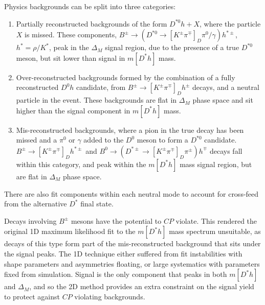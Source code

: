 \documentclass[oneside,12pt]{article}
\begin{document}
Physics backgrounds can be split into three categories:
\begin{enumerate}
	\item Partially reconstructed backgrounds of the form $D^{*0}h+X$, where the
particle $X$ is missed. These components, $B^{\pm}\rightarrow
(D^{*0}\rightarrow [K^{\pm}\pi^{\mp}]_D \pi^0/\gamma)h^{*\pm}$, $h^*=\rho/K^*$,
peak in the $\Delta_M$ signal region, due to the presence of a true $D^{*0}$
meson, but sit lower than signal in $m[D^*h]$ mass.
  \item Over-reconstructed backgrounds formed by the combination of a fully
	reconstructed $D^0h$ candidate, from $B^{\pm}\rightarrow
[K^{\pm}\pi^{\mp}]_Dh^{\pm}$ decays, and a neutral particle in the event.
These backgrounds are flat in $\Delta_M$ phase space and sit higher than the
signal component in $m[D^*h]$ mass.
  \item Mis-reconstructed backgrounds, where a pion in the true decay has been missed and
	a $\pi^0$ or $\gamma$ added to the $D^0$ meson to form a $D^{*0}$ candidate.
$B^{\pm}\rightarrow [K^{\pm}\pi^{\mp}]_Dh^{*\pm}$ and $B^{0}\rightarrow
(D^{*\pm}\rightarrow [K^{\pm}\pi^{\mp}]_D \pi^{\pm})h^{\mp}$ decays fall within
this category, and peak within the $m[D^*h]$ mass signal region, but are flat
in $\Delta_M$ phase space.
\end{enumerate}

There are also fit components within each neutral mode to account for
cross-feed from the alternative $D^*$ final state. 

Decays involving $B^{\pm}$ mesons have the potential to $CP$ violate. This
rendered the original 1D maximum likelihood fit to the $m[D^*h]$ mass spectrum
unsuitable, as decays of this type form part of the mis-reconstructed
background that sits under the signal peaks. The 1D technique either suffered
from fit instabilities with shape parameters and asymmetries floating, or large
systematics with parameters fixed from simulation. Signal is the only component
that peaks in both $m[D^*h]$ and $\Delta_M$, and so the 2D method provides an
extra constraint on the signal yield to protect against $CP$ violating
backgrounds.
\end{document}
